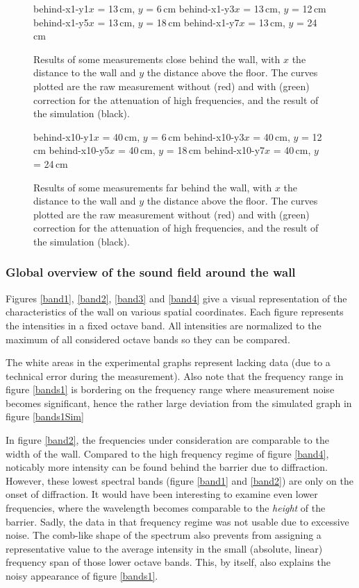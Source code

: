 \begin{figure}
\figOctaveTwoNoFigNoCaption{-0.0cm}
	{behind-x1-y1}{$x$ = 13\,cm, $y$ = 6\,cm}
	{behind-x1-y3}{$x$ = 13\,cm, $y$ = 12\,cm}
\figOctaveTwoNoFigNoCaption{-0.0cm}
	{behind-x1-y5}{$x$ = 13\,cm, $y$ = 18\,cm}
	{behind-x1-y7}{$x$ = 13\,cm, $y$ = 24\,cm}
\caption{Results of some measurements close behind the wall, with $x$ the distance to the wall and $y$ the distance above the floor. The curves plotted are the raw measurement without (red) and with (green) correction for the attenuation of high frequencies, and the result of the simulation (black). \label{behindNear}}
\end{figure}
\begin{figure}
\figOctaveTwoNoFigNoCaption{-0.0cm}
	{behind-x10-y1}{$x$ = 40\,cm, $y$ = 6\,cm}
	{behind-x10-y3}{$x$ = 40\,cm, $y$ = 12\,cm}
\figOctaveTwoNoFigNoCaption{-0.0cm}
	{behind-x10-y5}{$x$ = 40\,cm, $y$ = 18\,cm}
	{behind-x10-y7}{$x$ = 40\,cm, $y$ = 24\,cm}
\caption{Results of some measurements far behind the wall, with $x$ the distance to the wall and $y$ the distance above the floor. The curves plotted are the raw measurement without (red) and with (green) correction for the attenuation of high frequencies, and the result of the simulation (black). \label{behindFar}}
\end{figure}





\subsubsection*{Global overview of the sound field around the wall}
Figures \ref{band1}, \ref{band2}, \ref{band3} and \ref{band4} give a visual representation of the characteristics of the wall on various spatial coordinates. Each figure represents the intensities in a fixed octave band. All intensities are normalized to the maximum of all considered octave bands so they can be compared.

The white areas in the experimental graphs represent lacking data (due to a technical error during the measurement). Also note that the frequency range in figure \ref{bands1} is bordering on the frequency range where measurement noise becomes significant, hence the rather large deviation from the simulated graph in figure \ref{bands1Sim}

In figure \ref{band2}, the frequencies under consideration are comparable to the width of the wall. Compared to the high frequency regime of figure \ref{band4}, noticably more intensity can be found behind the barrier due to diffraction. However, these lowest spectral bands (figure \ref{band1} and \ref{band2}) are only on the onset of diffraction. It would have been interesting to examine even lower frequencies, where the wavelength becomes comparable to the \emph{height} of the barrier. Sadly, the data in that frequency regime was not usable due to excessive noise. The comb-like shape of the spectrum also prevents from assigning a representative value to the average intensity in the small (absolute, linear) frequency span of those lower octave bands. This, by itself, also explains the noisy appearance of figure \ref{bands1}.




